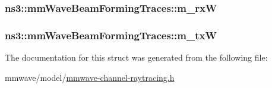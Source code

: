 \subsubsection[{\texorpdfstring{m\+\_\+rxW}{m_rxW}}]{ ns3\+::mm\+Wave\+Beam\+Forming\+Traces\+::m\+\_\+rxW}\hypertarget{structns3_1_1mmWaveBeamFormingTraces_ab23555ea0ed255a10c2b88fa31deda67}{}\label{structns3_1_1mmWaveBeamFormingTraces_ab23555ea0ed255a10c2b88fa31deda67}
\subsubsection[{\texorpdfstring{m\+\_\+txW}{m_txW}}]{ ns3\+::mm\+Wave\+Beam\+Forming\+Traces\+::m\+\_\+txW}\hypertarget{structns3_1_1mmWaveBeamFormingTraces_aff4c963b0b9f9951ee1beef8db31dfbb}{}\label{structns3_1_1mmWaveBeamFormingTraces_aff4c963b0b9f9951ee1beef8db31dfbb}


The documentation for this struct was generated from the following file\+:\begin{DoxyCompactItemize}
\item 
mmwave/model/\hyperlink{mmwave-channel-raytracing_8h}{mmwave-\/channel-\/raytracing.\+h}\end{DoxyCompactItemize}
